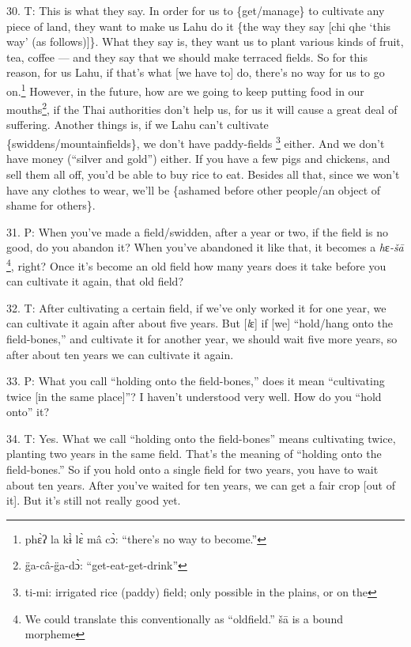 30. T: This is what they say. In order for us to \{get/manage\} to cultivate any
piece of land, they want to make us Lahu do it \{the way they say [chi qhe `this
way' (as follows)]\}. What they say is, they want us to plant various kinds of
fruit, tea, coffee --- and they say that we should make terraced fields. So for
this reason, for us Lahu, if that's what [we have to] do, there's no way for us
to go on.\footnote{phɛ̀ʔ la kɨ̀ lɛ̀ mâ cɔ̀: ``there's no way to become.''} However, in the future, how are we going to keep putting food in
our mouths\footnote{g̈a-câ-g̈a-dɔ̀: ``get-eat-get-drink''}, if the Thai authorities don't help us, for us it will cause a great
deal of suffering. Another things is, if we Lahu can't cultivate \{swiddens/mountainfields\},
we don't have paddy-fields \footnote{ti-mi: irrigated rice (paddy) field; only possible in the plains, or on the} either. And we don't have money (``silver and gold'')
either. If you have a few pigs and chickens, and sell them all off, you'd be able
to buy rice to eat. Besides all that, since we won't have any clothes to wear,
we'll be \{ashamed before other people/an object of shame for others\}.

31. P: When you've made a field/swidden, after a year or two, if the field is no
good, do you abandon it? When you've abandoned it like that, it becomes a \textit{h}ɛ\textit{-šā
}\footnote{We could translate this conventionally as ``oldfield.'' šā is a bound morpheme}, right? Once it's become an old field how many years does it take before
you can cultivate it again, that old field?

32. T: After cultivating a certain field, if we've only worked it for one year,
we can cultivate it again after about five years. But [\textit{l}ɛ] if [we] ``hold/hang
onto the field-bones,'' and cultivate it for another year, we should wait five
more years, so after about ten years we can cultivate it again.

33. P: What you call ``holding onto the field-bones,'' does it mean ``cultivating
twice [in the same place]''? I haven't understood very well. How do you ``hold
onto'' it?

34. T: Yes. What we call ``holding onto the field-bones'' means cultivating twice,
planting two years in the same field. That's the meaning of ``holding onto the
field-bones.'' So if you hold onto a single field for two years, you have to wait
about ten years. After you've waited for ten years, we can get a fair crop [out
of it]. But it's still not really good yet.

